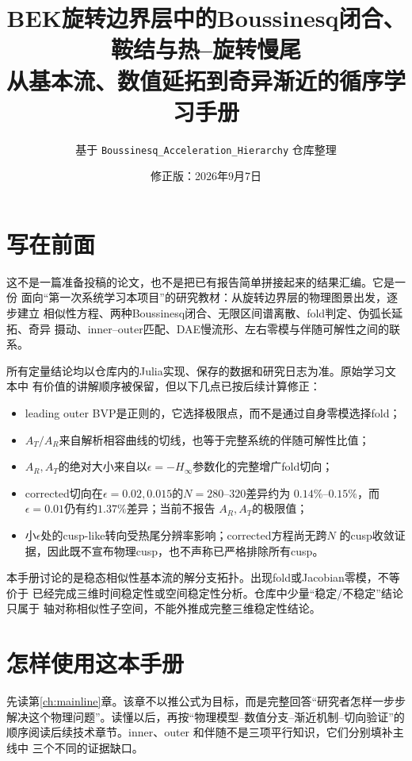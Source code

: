 \documentclass[UTF8,zihao=-4,openany]{ctexbook}
\title{\Huge BEK旋转边界层中的Boussinesq闭合、鞍结与热--旋转慢尾\\[0.8em]
\Large 从基本流、数值延拓到奇异渐近的循序学习手册}
\author{基于 \texttt{Boussinesq\_Acceleration\_Hierarchy} 仓库整理}
\date{修正版：2026年9月7日}
\newcommand{\eps}{\epsilon}
\newcommand{\Hinf}{H_\infty}
\begin{document}
\frontmatter
\maketitle

\chapter*{写在前面}

这不是一篇准备投稿的论文，也不是把已有报告简单拼接起来的结果汇编。它是一份
面向“第一次系统学习本项目”的研究教材：从旋转边界层的物理图景出发，逐步建立
相似性方程、两种Boussinesq闭合、无限区间谱离散、fold判定、伪弧长延拓、奇异
摄动、inner--outer匹配、DAE慢流形、左右零模与伴随可解性之间的联系。

所有定量结论均以仓库内的Julia实现、保存的数据和研究日志为准。原始学习文本中
有价值的讲解顺序被保留，但以下几点已按后续计算修正：

\begin{itemize}
  \item leading outer BVP是正则的，它选择极限点，而不是通过自身零模选择fold；
  \item $A_T/A_R$来自解析相容曲线的切线，也等于完整系统的伴随可解性比值；
  \item $A_R,A_T$的绝对大小来自以$\eps=-\Hinf$参数化的完整增广fold切向；
  \item corrected切向在$\eps=0.02,0.015$的$N=280$--$320$差异约为
  $0.14\%$--$0.15\%$，而$\eps=0.01$仍有约$1.37\%$差异；当前不报告
  $A_R,A_T$的极限值；
  \item 小$\eps$处的cusp-like转向受热尾分辨率影响；corrected方程尚无跨$N$
  的cusp收敛证据，因此既不宣布物理cusp，也不声称已严格排除所有cusp。
\end{itemize}

\begin{warningbox}
本手册讨论的是稳态相似性基本流的解分支拓扑。出现fold或Jacobian零模，不等价于
已经完成三维时间稳定性或空间稳定性分析。仓库中少量“稳定/不稳定”结论只属于
轴对称相似性子空间，不能外推成完整三维稳定性结论。
\end{warningbox}

\chapter*{怎样使用这本手册}

先读第\ref{ch:mainline}章。该章不以推公式为目标，而是完整回答“研究者怎样一步步
解决这个物理问题”。读懂以后，再按“物理模型--数值分支--渐近机制--切向验证”的
顺序阅读后续技术章节。inner、outer 和伴随不是三项平行知识，它们分别填补主线中
三个不同的证据缺口。
\end{document}
